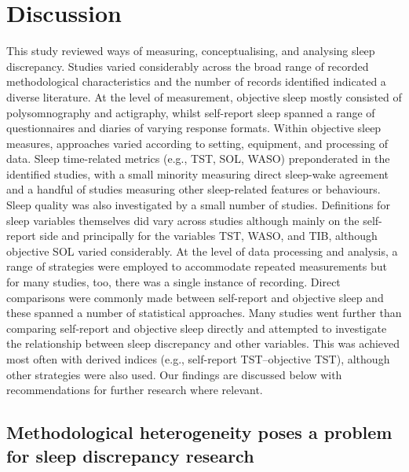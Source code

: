 \documentclass[
]{article}
\begin{document}
\section{Discussion}\label{item19}

This study reviewed ways of measuring, conceptualising, and analysing sleep discrepancy. Studies varied considerably across the broad range of recorded methodological characteristics and the number of records identified indicated a diverse literature. At the level of measurement, objective sleep mostly consisted of polysomnography and actigraphy, whilst self-report sleep spanned a range of questionnaires and diaries of varying response formats. Within objective sleep measures, approaches varied according to setting, equipment, and processing of data. Sleep time-related metrics (e.g., TST, SOL, WASO) preponderated in the identified studies, with a small minority measuring direct sleep-wake agreement and a handful of studies measuring other sleep-related features or behaviours. Sleep quality was also investigated by a small number of studies. Definitions for sleep variables themselves did vary across studies although mainly on the self-report side and principally for the variables TST, WASO, and TIB, although objective SOL varied considerably. At the level of data processing and analysis, a range of strategies were employed to accommodate repeated measurements but for many studies, too, there was a single instance of recording. Direct comparisons were commonly made between self-report and objective sleep and these spanned a number of statistical approaches. Many studies went further than comparing self-report and objective sleep directly and attempted to investigate the relationship between sleep discrepancy and other variables. This was achieved most often with derived indices (e.g., self-report TST--objective TST), although other strategies were also used. Our findings are discussed below with recommendations for further research where relevant.

\subsection{Methodological heterogeneity poses a problem for sleep discrepancy research}\label{methodological-heterogeneity-poses-a-problem-for-sleep-discrepancy-research}
\end{document}
